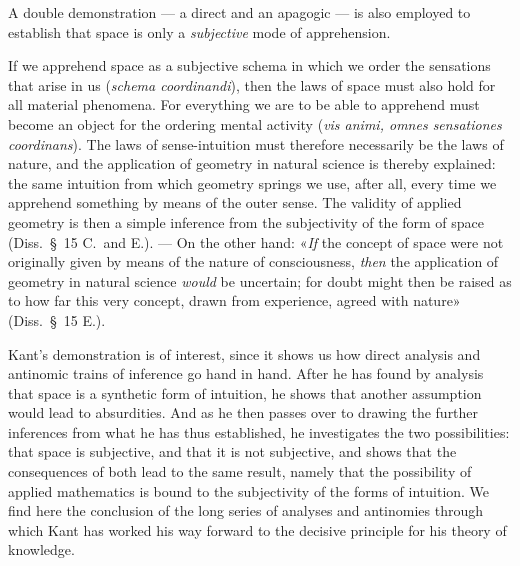 \documentclass[12pt,a4paper]{article}
\begin{document}
A double demonstration --- a direct and an apagogic --- is also employed to
establish that space is only a \emph{subjective} mode of apprehension.

If we apprehend space as a subjective schema in which we order the
sensations that arise in us (\textit{schema coordinandi}), then the laws of
space must also hold for all material phenomena. For everything we are to be
able to apprehend must become an object for the ordering mental activity
(\textit{vis animi, omnes sensationes coordinans}). The laws of
sense-intuition must therefore necessarily be the laws of nature, and the
application of geometry in natural science is thereby explained: the same
intuition from which geometry springs we use, after all, every time we
apprehend something by means of the outer sense. The validity of applied
geometry is then a simple inference from the subjectivity of the form of
space (Diss.\ §\ 15 C.\ and E.). --- On the other hand: «\emph{If} the concept of
space were not originally given by means of the nature of consciousness,
\emph{then} the application of geometry in natural science \emph{would} be uncertain; for
doubt might then be raised as to how far this very concept, drawn from
experience, agreed with nature» (Diss.\ §\ 15 E.).

Kant's demonstration is of interest, since it shows us how direct analysis
and antinomic trains of inference go hand in hand. After he has found by
analysis that space is a synthetic form of intuition, he shows that another
assumption would lead to absurdities. And as he then passes over to drawing
the further inferences from what he has thus established, he investigates the
two possibilities: that space is subjective, and that it is not subjective,
and shows that the consequences of both lead to the same result, namely that
the possibility of applied mathematics is bound to the subjectivity of the
forms of intuition. We find here the conclusion of the long series of
analyses and antinomies through which Kant has worked his way forward to the
decisive principle for his theory of knowledge.
\end{document}
